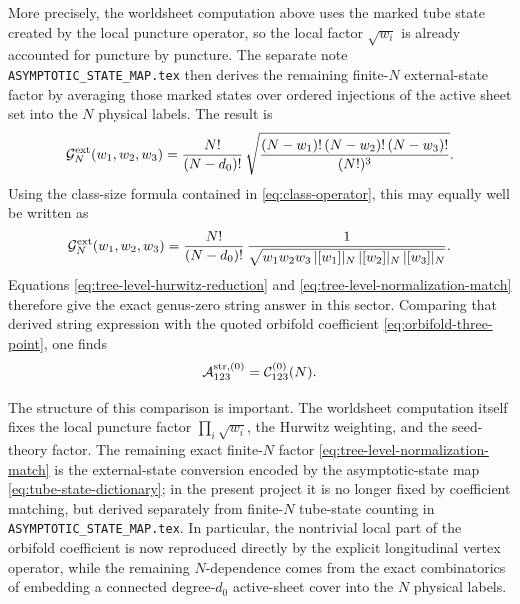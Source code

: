\documentclass[11pt]{article}
\newcommand{\mc}[1]{\mathcal{#1}}
\begin{document}
More precisely, the worldsheet computation above uses the marked tube state created by the local puncture operator, so the local factor $\sqrt{w_i}$ is already accounted for puncture by puncture. The separate note \texttt{ASYMPTOTIC\_STATE\_MAP.tex} then derives the remaining finite-$N$ external-state factor by averaging those marked states over ordered injections of the active sheet set into the $N$ physical labels. The result is
\begin{equation}\label{eq:tree-level-normalization-match}
\mc G_N^{\rm ext}(w_1,w_2,w_3)
=
\frac{N!}{(N-d_0)!}\,
\sqrt{
\frac{(N-w_1)!\,(N-w_2)!\,(N-w_3)!}{(N!)^3}
}.
\end{equation}
Using the class-size formula contained in \eqref{eq:class-operator}, this may equally well be written as
\begin{equation}\label{eq:external-class-factor}
\mc G_N^{\rm ext}(w_1,w_2,w_3)
=
\frac{N!}{(N-d_0)!}\,
\frac{1}{\sqrt{w_1w_2w_3\,|[w_1]|_N\,|[w_2]|_N\,|[w_3]|_N}}.
\end{equation}
Equations \eqref{eq:tree-level-hurwitz-reduction} and \eqref{eq:tree-level-normalization-match} therefore give the exact genus-zero string answer in this sector. Comparing that derived string expression with the quoted orbifold coefficient \eqref{eq:orbifold-three-point}, one finds
\begin{equation}
\mc A^{\rm str,(0)}_{123}
=
\mc C_{123}^{(0)}(N).
\end{equation}

The structure of this comparison is important. The worldsheet computation itself fixes the local puncture factor $\prod_i\sqrt{w_i}$, the Hurwitz weighting, and the seed-theory factor. The remaining exact finite-$N$ factor \eqref{eq:tree-level-normalization-match} is the external-state conversion encoded by the asymptotic-state map \eqref{eq:tube-state-dictionary}; in the present project it is no longer fixed by coefficient matching, but derived separately from finite-$N$ tube-state counting in \texttt{ASYMPTOTIC\_STATE\_MAP.tex}. In particular, the nontrivial local part of the orbifold coefficient is now reproduced directly by the explicit longitudinal vertex operator, while the remaining $N$-dependence comes from the exact combinatorics of embedding a connected degree-$d_0$ active-sheet cover into the $N$ physical labels.
\end{document}
